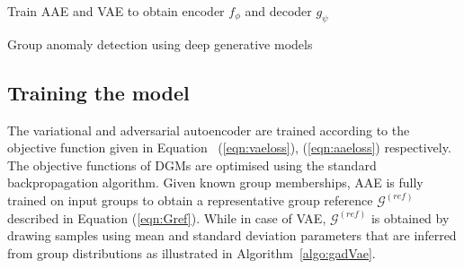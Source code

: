   

\vspace{4mm}
\begin{algorithm}[t]
\DontPrintSemicolon
\SetAlgoLined
{}
\Input{ Groups $  \big\{  { \bf G}_1, { \bf  G}_2,\dots,  {\bf  G}_M \big \}  $  where  ${\bf G}_m  =\big( X_{mnv}\big) \in \mathbb{R}^{N_m \times V} $
}
\BlankLine
{}
\BlankLine
Train AAE and VAE to obtain encoder $f_\phi$ and decoder $g_\psi$    \;
\BlankLine
\caption{Group anomaly detection using deep generative models}
\label{algo:gadVae}
\end{algorithm}


%
\subsection{Training the model}
\label{sec:training}
The variational and adversarial autoencoder are trained according to the objective function given in Equation ~(\ref{eqn:vaeloss}), (\ref{eqn:aaeloss}) respectively. The objective functions of DGMs are optimised using the standard backpropagation algorithm. Given known  group memberships, AAE is fully trained on input groups to obtain a  representative group reference $\mathcal{G}^{(ref)}$ described in Equation (\ref{eqn:Gref}). While in case of VAE, $\mathcal{G}^{(ref)}$ is obtained by drawing samples using mean and standard deviation parameters that are inferred from group distributions as illustrated in Algorithm~\ref{algo:gadVae}.

